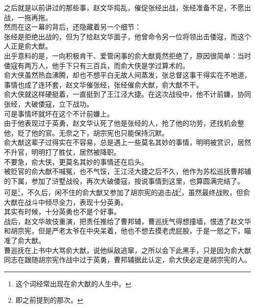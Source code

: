 \begin{multicols}{\theparacolNo}
之后就是以前讲过的那些事，赵文华捣乱，催促张经出战，张经准备不足，不愿出战，一拖再拖。\\

然而在这一幕的背后，还隐藏着另一个细节：\\

张经是拒绝出战的，但为了给赵文华面子，他曾命令另一位将领出击倭寇，而这个人正是俞大猷。\\

出乎意料的是，一向积极肯干、爱管闲事的俞大猷竟然拒绝了，原因很简单：当时倭寇有两万人，他手下只有三百兵，而俞大侠是学过算术的。\\

俞大侠虽然热血沸腾，却也不想平白无故人间蒸发，张总督这事干得实在不地道，事情也成了连环套，赵文华催张经，张经催俞大猷，俞大猷不干。\\

俞大侠就这样硬挺着，一直挺到了王江泾大捷。在这次战役中，他不计前嫌，协同张经，大破倭寇，立下战功。\\

可是事情坏就坏在这个不计前嫌上。\\

由于他表现过于英勇，赵文华认死了他是张经的人，抢了他的功劳，还找机会整他，贬了他的官。无奈之下，胡宗宪也只能保持沉默。\\

俞大猷这辈子过得实在不容易，总是遇上一些莫名其妙的事情，明明被赏识，居然不升官，明明打了胜仗，居然被降职。\\

不要急，俞大侠，更莫名其妙的事情还在后头。\\

被贬官的俞大猷不喊冤，也不气馁，王江泾大捷之后不久，他作为苏松巡抚曹邦辅的下属，参加了浒墅战役，再次大破倭寇，按说事情到这里，也算圆满完结了。\\

可是\footnote{这个词经常出现在俞大猷的人生中。}，不久后，闲不住的俞大猷又参加了胡宗宪的追击战\footnote{即之前提到的那次。}，虽然最终战败，但俞大猷在战斗中倾尽全力，表现十分英勇。\\

其实有时候，十分英勇也不是个好事。\\

战后，赵文华故伎重演，把责任推给了曹邦辅，曹巡抚气得想撞墙，恨透了赵文华和胡宗宪，但是严老太爷在中央呆着，他也不想去摸老虎屁股，于是一怒之下，瞄准了俞大猷。\\

曹巡抚在上书中大骂俞大猷，说他纵敌逃窜，之所以会下此黑手，只是因为俞大猷同志在跟随胡宗宪作战中过于英勇，曹邦辅据此认定，俞大侠必定是胡宗宪的人。\\


\end{multicols}

